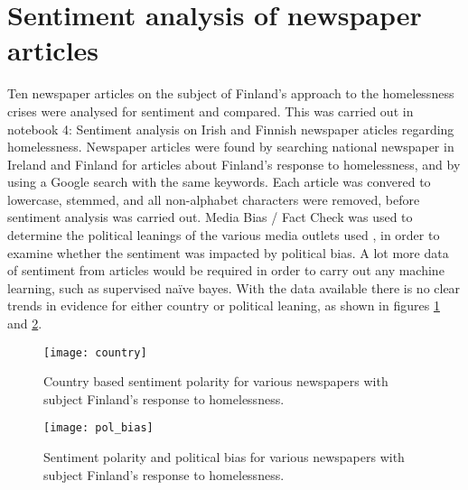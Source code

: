 \documentclass[hidelinks,12pt,oneside]{report} %
\begin{document}
\section{Sentiment analysis of newspaper articles}
Ten newspaper articles on the subject of Finland's approach to the homelessness crises were analysed for sentiment and compared. This was carried out in notebook 4: Sentiment analysis on Irish and Finnish newspaper aticles regarding homelessness. Newspaper articles were found by searching national newspaper in Ireland and Finland for articles about Finland's response to homelessness, and by using a Google search with the same keywords. Each article was convered to lowercase, stemmed, and all non-alphabet characters were removed, before sentiment analysis was carried out. Media Bias / Fact Check was used to determine the political leanings of the various media outlets used \citep{bias}, in order to examine whether the sentiment was impacted by political bias. A lot more data of sentiment from articles would be required in order to carry out any machine learning, such as supervised naïve bayes. With the data available there is no clear trends in evidence for either country or political leaning, as shown in figures \ref{fig:country} and \ref{fig:pol_bias}.

\begin{figure}[!ht]
	\centering
	\vspace{.4218cm}
		\texttt{[image: country]}	\captionsetup{justification=justified,width=1\linewidth}
	\caption{Country based sentiment polarity for various newspapers with subject Finland's response to homelessness.}
\label{fig:country}
\end{figure}

\begin{figure}[!ht]
	\centering
	\vspace{.4218cm}
		\texttt{[image: pol\_bias]}	\captionsetup{justification=justified,width=1\linewidth}
	\caption{Sentiment polarity and political bias for various newspapers with subject Finland's response to homelessness.}
\label{fig:pol_bias}
\end{figure}
\end{document}
